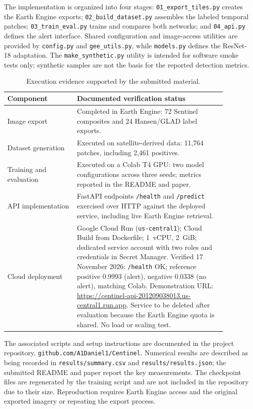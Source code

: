 \documentclass{article}
\begin{document}
The implementation is organized into four stages: \texttt{01\_export\_tiles.py} creates the Earth Engine exports; \texttt{02\_build\_dataset.py} assembles the labeled temporal patches; \texttt{03\_train\_eval.py} trains and compares both networks; and \texttt{04\_api.py} defines the alert interface. Shared configuration and image-access utilities are provided by \texttt{config.py} and \texttt{gee\_utils.py}, while \texttt{models.py} defines the ResNet-18 adaptation. The \texttt{make\_synthetic.py} utility is intended for software smoke tests only; synthetic samples are not the basis for the reported detection metrics.

\begin{table}[htbp]
\centering
\small
\caption{Execution evidence supported by the submitted material.}
\label{tab:prototype-verification}
\begin{tabular}{|p{0.28\linewidth}|p{0.60\linewidth}|}
\hline
\textbf{Component} & \textbf{Documented verification status} \\ \hline
Image export & Completed in Earth Engine: 72 Sentinel composites and 24 Hansen/GLAD label exports. \\ \hline
Dataset generation & Executed on satellite-derived data: 11,764 patches, including 2,461 positives. \\ \hline
Training and evaluation & Executed on a Colab T4 GPU: two model configurations across three seeds; metrics reported in the README and paper. \\ \hline
API implementation & FastAPI endpoints \texttt{/health} and \texttt{/predict} exercised over HTTP against the deployed service, including live Earth Engine retrieval. \\ \hline
Cloud deployment & Google Cloud Run (\texttt{us-central1}); Cloud Build from Dockerfile; 1~vCPU, 2~GiB; dedicated service account with two roles and credentials in Secret Manager. Verified 17 November 2026: \texttt{/health} OK; reference positive 0.9993 (alert), negative 0.0338 (no alert), matching Colab. Demonstration URL: \url{https://centinel-api-201209038013.us-central1.run.app}. Service to be deleted after evaluation because the Earth Engine quota is shared. No load or scaling test. \\ \hline
\end{tabular}
\end{table}

The associated scripts and setup instructions are documented in the project repository, \texttt{github.com/A1Daniel1/Centinel}. Numerical results are described as being recorded in \texttt{results/summary.csv} and \texttt{results/results.json}; the submitted README and paper report the key measurements. The checkpoint files are regenerated by the training script and are not included in the repository due to their size. Reproduction requires Earth Engine access and the original exported imagery or repeating the export process.
\end{document}
